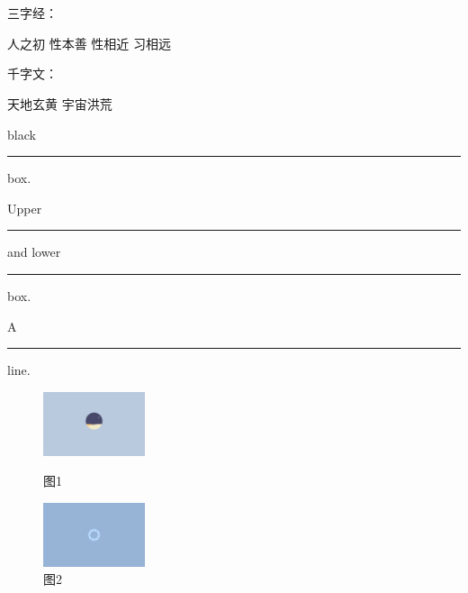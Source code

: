 \documentclass{ctexbook}
\begin{document}
\\

\\[1ex]
\setlength{\fboxrule}{1.6pt}
\setlength{\fboxsep}{1em}

三字经：\parbox[t]{3em}%
{人之初 性本善 性相近 习相远}
\quad
千字文：
\begin{minipage}[b][8ex]{4em}
天地玄黄 宇宙洪荒
\end{minipage}


black \rule{12pt}{4pt} box.

Upper \rule[4pt]{6pt}{8pt} and 
lower \rule[-4pt]{6pt}{8pt} box.

A  \rule[-.4pt]{3em}{.4pt} line.


\begin{figure}[htbp]
    \centering
    \begin{minipage}{15em}
        \centering
        \includegraphics[width=3cm]{1.png}
        \caption{图1}
    \end{minipage}
    \qquad
    \begin{minipage}{15em}
        \centering
        \includegraphics[width=3cm]{2.png}
        \caption{图2}
    \end{minipage}
\end{figure}
\end{document}
